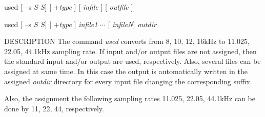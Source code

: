 % 
% 
% 
% 
%                                                                        
%

\begin{synopsis}
\item [uscd] [ --s $S$ $S$] [ +{\em type} ] [ {\em infile} ] [ {\em outfile} ]
\item [uscd] [ --s $S$ $S$] [ +{\em type} ] {\em infile1} $\cdots$ [ {\em infileN}] {\em outdir} 
\end{synopsis}

\begin{qsection}{DESCRIPTION}
The command {\em uscd} converts from
8, 10, 12, 16kHz to 11.025, 22.05, 44.1kHz sampling rate.
If input and/or output files are not assigned,
then the standard input and/or output are used, respectively.
Also, several files can be assigned at same time.
In this case the output is automatically written in the assigned
{\em outdir} directory for every input file
changing the corresponding suffix.

Also, the assignment the following sampling rates 11.025, 22.05, 44.1kHz
can be done by 11, 22, 44, respectively.
\par
\end{qsection}

